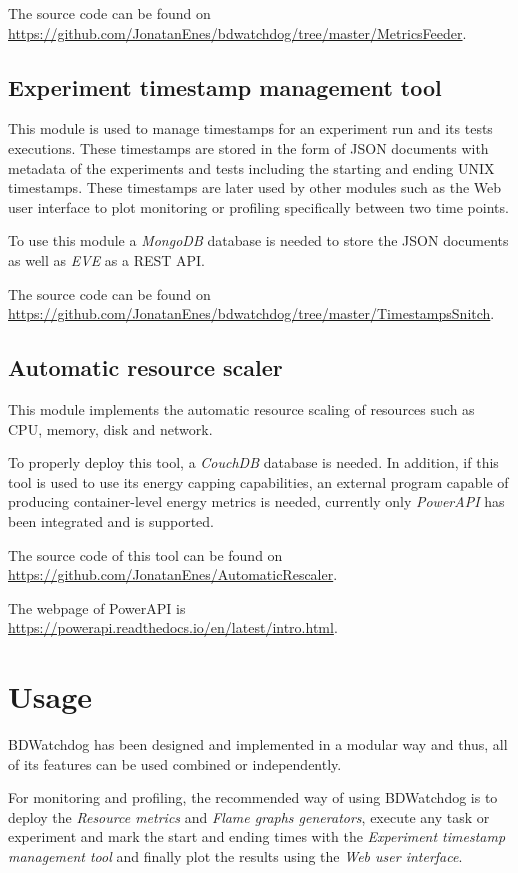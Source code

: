 \documentclass[12pt]{article}
\begin{document}
The source code can be found on
\url{https://github.com/JonatanEnes/bdwatchdog/tree/master/MetricsFeeder}.

\subsection{Experiment timestamp management tool}

This module is used to manage timestamps for an experiment run and its tests executions. These timestamps are stored in the form of JSON documents with metadata of the experiments and tests including the starting and ending UNIX timestamps. These timestamps are later used by other modules such as the Web user interface to plot monitoring or profiling specifically between two time points.

To use this module a \textit{MongoDB} database is needed to store the JSON documents as well as \textit{EVE} as a REST API. 

The source code can be found on
\url{https://github.com/JonatanEnes/bdwatchdog/tree/master/TimestampsSnitch}.

\subsection{Automatic resource scaler}

This module implements the automatic resource scaling of resources such as CPU, memory, disk and network. 

To properly deploy this tool, a \textit{CouchDB} database is needed. In addition, if this tool is used to use its energy capping capabilities, an external program capable of producing container-level energy metrics is needed, currently only \textit{PowerAPI} has been integrated and is supported.

The source code of this tool can be found on
\url{https://github.com/JonatanEnes/AutomaticRescaler}.

The webpage of PowerAPI is \url{https://powerapi.readthedocs.io/en/latest/intro.html}.


\section{Usage}

BDWatchdog has been designed and implemented in a modular way and thus, all of its features can be used combined or independently. 

For monitoring and profiling, the recommended way of using BDWatchdog is to deploy the \textit{Resource metrics} and \textit{Flame graphs generators}, execute any task or experiment and mark the start and ending times with the \textit{Experiment timestamp management tool} and finally plot the results using the \textit{Web user interface}.
\end{document}
